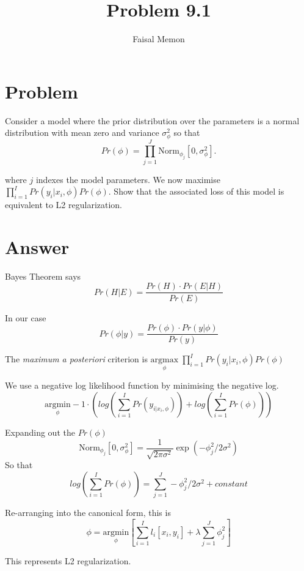 \documentclass{article}
\title{Problem 9.1}
\author{Faisal Memon}
\begin{document}
\maketitle

\section{Problem}

Consider a model where the prior distribution over the parameters is a normal distribution with mean zero and variance $ \sigma_{\phi}^{2} $ so that
\begin{equation*}
   Pr(\phi) = \prod_{j=1}^{J} \text{Norm}_{\phi_{j}}[0, \sigma_{\phi}^{2}].
\end{equation*}

where $ j $ indexes the model parameters.  We now maximise $ \prod_{i=1}^{I} Pr(y_{i} | x_{i},\phi)Pr(\phi) $.  Show that the associated loss of this model is equivalent to L2 regularization.

\section{Answer} 

Bayes Theorem says
\begin{equation*}
   Pr(H|E) = \frac{Pr(H) \cdot Pr(E|H)}{Pr(E)}
\end{equation*}

In our case
\begin{equation*}
   Pr( \phi | y) = \frac{Pr(\phi) \cdot Pr(y | \phi)}{Pr(y)}   
\end{equation*}

The \textit{maximum a posteriori}  criterion is $ \underset{\phi}{\mathrm{argmax}}  \;  \prod_{i=1}^{I} Pr(y_{i} | x_{i},\phi)Pr(\phi)$

We use a negative log likelihood function by minimising the negative log.
\begin{equation*}
   \underset{\phi}{\mathrm{argmin}} -1 \cdot \left( log \left(\sum_{i=1}^{I}Pr(y_{i|x_{i}, \phi}) \right) + log \left(\sum_{i=1}^{I} Pr(\phi)   \right) \right)
\end{equation*}

Expanding out the $ Pr(\phi) $
\begin{equation*}
   \text{Norm}_{\phi_{j}}[0, \sigma_{\phi}^{2}] = \frac{1}{\sqrt{2 \pi \sigma^{2}}} \exp (- \phi_{j}^{2}/2\sigma^{2})
\end{equation*}
So that
\begin{equation*}
   log \left(\sum_{i=1}^{I} Pr(\phi)   \right) = \sum_{j=1}^{J} - \phi_{j}^{2}/2\sigma^{2} + constant
\end{equation*}

Re-arranging into the canonical form, this is
\begin{equation*}
   \phi = \underset{\phi}{\mathrm{argmin}} \left[  \sum_{i=1}^{I} l_{i}[x_{i}, y_{i}] + \lambda \sum_{j=1}^{J} \phi_{j}^{2}  \right]
\end{equation*}

This represents L2 regularization.
\end{document}
